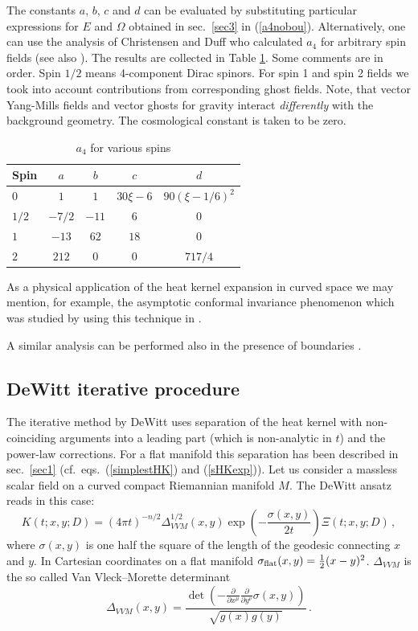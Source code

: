 The constants $a$, $b$, $c$ and $d$ can be evaluated by substituting
particular expressions for $E$ and $\Omega$ obtained in sec.\ 
\ref{sec3} in (\ref{a4nobou}). Alternatively, one can use the
analysis of Christensen and Duff \cite{Christensen:1979md}
who calculated $a_4$ for arbitrary spin fields (see also
\cite{Birrell:1982ix}). The results are collected in Table \ref{a4table}.
Some comments are in order. Spin $1/2$ means 4-component Dirac spinors.
For spin 1 and spin 2 fields we took into
account contributions from corresponding ghost fields. Note, that
vector Yang-Mills fields and vector ghosts for gravity interact
{\em differently} with the background geometry. The cosmological
constant is taken to be zero. 
\begin{table}%
\caption{$a_4$ for various spins}
\begin{tabular}{|l|c|c|c|c|}\hline \label{a4table}
Spin & $a$ & $b$ & $c$ & $d$ \\ \hline
$0$ &    $1$ & $1$ & $30\xi -6$ & $90 (\xi -1/6)^2$ \\
$1/2$&    $-7/2$ & $-11$ & $6$ & $0$ \\
$1$ &    $-13$  & $62$  & $18$ & $0$ \\
$2$ &    $212$  & $0$   & $0$  & $717/4$ \\ \hline %
\end{tabular}
\end{table}  

As a physical application of the heat kernel expansion in curved
space we may mention, for example, the asymptotic conformal invariance
phenomenon which was studied by using this technique in
\cite{Buchbinder:1984zx,Buchbinder:1985ba,Buchbinder:1984gj,Buchbinder:1988pm}.

A similar analysis can be performed also in the presence of boundaries
\cite{Moss:1994jj}.
\subsection{DeWitt iterative procedure}\label{s4iter}
The iterative method by DeWitt uses separation of the heat kernel
with non-coinciding arguments into a leading part (which is non-analytic
in $t$) and the power-law corrections. For a flat manifold this separation
has been described in sec.\ \ref{sec1} (cf.\ eqs.\ (\ref{simplestHK})
and (\ref{sHKexp})). Let us consider a massless scalar field on
a curved compact Riemannian manifold $M$. The DeWitt ansatz reads
in this case:
\begin{equation}
K(t;x,y;D)=(4\pi t)^{-n/2} \Delta_{VVM}^{1/2}(x,y) \exp 
\left( -\frac{\sigma(x,y)}{2t} \right) \Xi (t;x,y;D)\,,
\label{DWansatz}
\end{equation}
where $\sigma (x,y)$ is one half the square of the length of
the geodesic connecting $x$ and $y$. In Cartesian coordinates
on a flat manifold $\sigma_{\rm flat}(x,y)=\frac 12 (x-y)^2$.
$\Delta_{VVM}$ is the so called Van Vleck--Morette determinant
\begin{equation}
\Delta_{VVM}(x,y) =\frac{\det \left( -\frac{\partial}{\partial x^\mu}
\frac{\partial}{\partial y^\nu} \sigma (x,y) \right)}{\sqrt{g(x)g(y)}}
\,.\label{VVMdet}
\end{equation}

